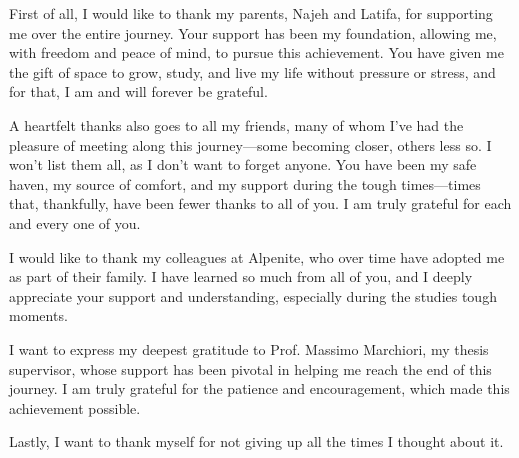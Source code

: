 
First of all, I would like to thank my parents, Najeh and Latifa, for supporting me over the entire journey. Your support has been my foundation, allowing me, with freedom and peace of mind, to pursue this achievement. You have given me the gift of space to grow, study, and live my life without pressure or stress, and for that, I am and will forever be grateful. \newline

A heartfelt thanks also goes to all my friends, many of whom I've had the pleasure of meeting along this journey—some becoming closer, others less so. I won’t list them all, as I don’t want to forget anyone. You have been my safe haven, my source of comfort, and my support during the tough times—times that, thankfully, have been fewer thanks to all of you. I am truly grateful for each and every one of you. \newline

I would like to thank my colleagues at Alpenite, who over time have adopted me as part of their family. I have learned so much from all of you, and I deeply appreciate your support and understanding, especially during the studies tough moments. \newline

I want to express my deepest gratitude to Prof. Massimo Marchiori, my thesis supervisor, whose support has been pivotal in helping me reach the end of this journey. I am truly grateful for the patience and encouragement, which made this achievement possible. \newline

Lastly, I want to thank myself for not giving up all the times I thought about it.

